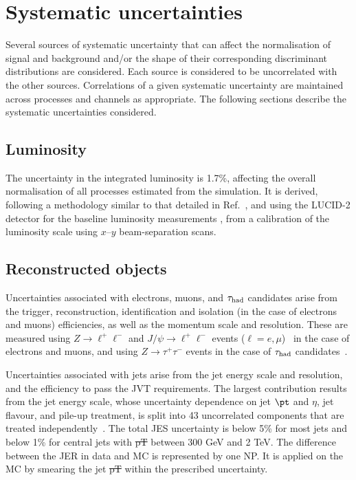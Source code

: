 \documentclass[PAPER, coverpage, atlasdraft=true, texlive=2016, UKenglish]{\ATLASLATEXPATH atlasdoc}
\providecommand{\DIFadd}[1]{{\protect\color{blue}\uwave{#1}}} %
\providecommand{\DIFdel}[1]{{\protect\color{red}\sout{#1}}}                      %
\providecommand{\DIFaddbegin}{} %
\providecommand{\DIFaddend}{} %
\providecommand{\DIFdelbegin}{} %
\providecommand{\DIFdelend}{} %
\begin{document}
\DIFaddend %
\section{Systematic uncertainties}
\label{sec:systematics}

Several sources of systematic uncertainty that can affect the normalisation of signal 
and background and/or the shape of their corresponding discriminant distributions are considered.
Each source is considered to be uncorrelated with the other sources.  
Correlations of a given systematic uncertainty are maintained across processes and channels 
as appropriate.
The following sections describe the systematic uncertainties considered.

\subsection{Luminosity}
\label{sec:syst_lumi}

The uncertainty in the integrated luminosity is 1.7\%, affecting the overall normalisation of all processes estimated from the simulation. 
It is derived, following a methodology similar to that detailed in Ref.~\cite{Aaboud:2016hhf}, and using the LUCID-2 detector 
for the baseline luminosity measurements \cite{Avoni:2018iuv}, from a calibration of the luminosity scale using $x$--$y$ beam-separation scans.

\subsection{Reconstructed objects}
\label{sec:syst_objects}

Uncertainties associated with electrons, muons, and $\tau_{\mathrm{had}}$ candidates arise from the trigger, reconstruction,  
identification and isolation (in the case of electrons and muons) efficiencies, as well as the momentum scale and resolution. 
These are measured using $Z\to \ell^+\ell^-$ and $J/\psi\to \ell^+\ell^-$ events ($\ell =e, \mu$)~\cite{ATLAS-CONF-2016-024,Aad:2016jkr} 
in the case of electrons and muons, and using $Z\to \tau^+\tau^-$ events in the case of $\tau_{\mathrm{had}}$ candidates~\cite{ATLAS-CONF-2017-029}.

Uncertainties associated with jets arise from the jet energy scale
and resolution, and the efficiency to pass the JVT requirements. 
The largest contribution results from the jet energy scale, whose uncertainty dependence on jet $\pt$ and $\eta$, jet flavour, and pile-up treatment, 
is split into 43 uncorrelated components that are treated independently~\cite{Aaboud:2017jcu}. The total JES uncertainty is
below 5\% for most jets and below 1\% for central jets with \DIFdelbegin \DIFdel{pT }\DIFdelend \DIFaddbegin \DIFadd{$\pt$ }\DIFaddend between 300 GeV and 2 TeV. The difference between the JER
in data and MC is represented by one NP. It is applied on the MC by smearing the jet \DIFdelbegin \DIFdel{pT }\DIFdelend \DIFaddbegin \DIFadd{$\pt$ }\DIFaddend within the prescribed uncertainty.
\end{document}
